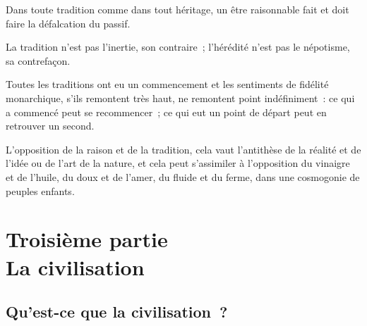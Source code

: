 \documentclass[french,twoside]{book} %
\newcommand{\astermono}{\medskip\centerline{\color{rubric}\large\selectfont{\syms ✻}}\medskip\par}%
\newcommand\chapteropen{} %
\newcommand\chaptercont{} %
\newcommand\chapterclose{} %
\begin{document}
\astermono

\noindent Dans toute tradition comme dans tout héritage, un être raisonnable fait et doit faire la défalcation du passif.\par

\astermono

\noindent La tradition n’est pas l’inertie, son contraire ; l’hérédité n’est pas le népotisme, sa contrefaçon.\par

\astermono

\noindent Toutes les traditions ont eu un commencement et les sentiments de fidélité monarchique, s’ils remontent très haut, ne remontent point indéfiniment : ce qui a commencé peut se recommencer ; ce qui eut un point de départ peut en retrouver un second.\par
L’opposition de la raison et de la tradition, cela vaut l’antithèse de la réalité et de l’idée ou de l’art de la nature, et cela peut s’assimiler à l’opposition du vinaigre et de l’huile, du doux et de l’amer, du fluide et du ferme, dans une cosmogonie de peuples enfants.
\chapterclose


\chapteropen
\chapter[Troisième partie. La civilisation]{Troisième partie \\
La civilisation}\renewcommand{\leftmark}{Troisième partie \\
La civilisation}


\chaptercont
\section[Qu’est-ce que la civilisation ?]{Qu’est-ce que la civilisation ?}
\end{document}
